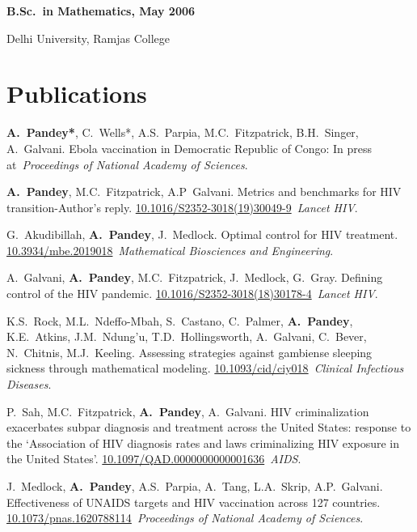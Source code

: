 \documentclass[margin,line,pifont,palatino,courier]{res}
\newcommand\doilink[1]{\href{http://dx.doi.org/#1}{#1}}
\newenvironment{list1}{
  \begin{list}{\ding{113}}{%
      \setlength{\itemsep}{0in}
      \setlength{\parsep}{0in} \setlength{\parskip}{0in}
      \setlength{\topsep}{0in} \setlength{\partopsep}{0in}
      \setlength{\leftmargin}{0.17in}}}{\end{list}}
\begin{document}
\begin{resume}
\begin{list1}
\end{list1}

{\bf B.Sc.~in  Mathematics, May 2006}\\
\vspace*{-.1in}
\begin{list1}
\item[] Delhi University, Ramjas College
\end{list1}



\section{\sc Publications}
\textbf{A.~Pandey*}, C.~Wells*, A.S.~Parpia, M.C.~Fitzpatrick,
B.H.~Singer, A.~Galvani. {Ebola vaccination in Democratic Republic of
  Congo}: In press at~\textit{Proceedings of
  National Academy of Sciences}.

\textbf{A.~Pandey}, M.C.~Fitzpatrick, A.P~Galvani. {Metrics and
  benchmarks for HIV transition-Author's
  reply}. \doilink{10.1016/S2352-3018(19)30049-9}~\textit{Lancet
HIV}.

G.~Akudibillah, \textbf{A.~Pandey}, J.~Medlock. {Optimal control for
  HIV treatment}. \\ \doilink{10.3934/mbe.2019018}~\textit{Mathematical Biosciences and Engineering}.

A.~Galvani, \textbf{A.~Pandey}, M.C.~Fitzpatrick, J.~Medlock,
G.~Gray. {Defining control of the HIV pandemic}.
\doilink{10.1016/S2352-3018(18)30178-4}~\textit{Lancet HIV}.

K.S.~Rock, M.L.~Ndeffo-Mbah, S.~Castano, C.~Palmer,
\textbf{A.~Pandey}, K.E.~Atkins, J.M.~Ndung'u, T.D.~Hollingsworth,
A.~Galvani, C.~Bever, N.~Chitnis, M.J.~Keeling. {Assessing strategies
  against gambiense sleeping sickness through mathematical
  modeling}. \doilink{10.1093/cid/ciy018}~\textit{Clinical Infectious Diseases}.

P.~Sah, M.C.~Fitzpatrick, \textbf{A.~Pandey}, A.~Galvani. {HIV
  criminalization exacerbates subpar diagnosis and treatment across
  the United States: response to the `Association of HIV diagnosis
  rates and laws criminalizing HIV exposure in the United States'}.
\doilink{10.1097/QAD.0000000000001636}~\textit{AIDS}.

J.~Medlock, \textbf{A.~Pandey}, A.S.~Parpia, A.~Tang, L.A.~Skrip,
A.P.~Galvani. {Effectiveness of UNAIDS targets and HIV vaccination
  across 127
  countries}. \doilink{10.1073/pnas.1620788114}~\textit{Proceedings of
  National Academy of Sciences}.


\end{resume}
\end{document}
